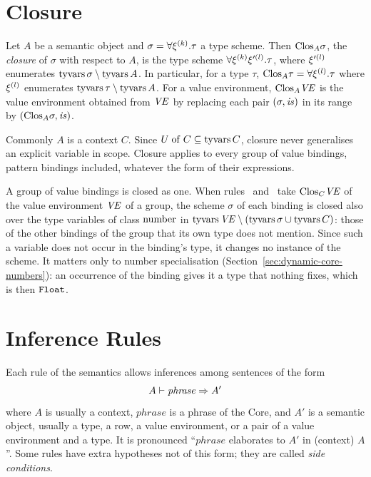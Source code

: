 \section{Closure}\label{sec:static-core-closure}

Let $A$ be a semantic object and $\sigma = \forall\xi^{(k)}.\tau$ a type
scheme. Then $\mathrm{Clos}_A \sigma$, the \emph{closure} of $\sigma$ with respect to
$A$, is the type scheme $\forall\xi^{(k)}\xi'^{(l)}.\tau$, where
$\xi'^{(l)}$ enumerates $\mathrm{tyvars}\,\sigma \setminus \mathrm{tyvars}\, A$. In
particular, for a type $\tau$, $\mathrm{Clos}_A \tau = \forall\xi^{(l)}.\tau$
where $\xi^{(l)}$ enumerates $\mathrm{tyvars}\,\tau \setminus \mathrm{tyvars}\, A$. For a
value environment, $\mathrm{Clos}_A \mathit{VE}$ is the value environment obtained from $\mathit{VE}$
by replacing each pair $(\sigma, \mathit{is})$ in its range by $(\mathrm{Clos}_A \sigma, \mathit{is})$.

Commonly $A$ is a context $C$. Since $U \mathrel{\mathrm{of}} C \subseteq \mathrm{tyvars}\, C$, closure
never generalises an explicit variable in scope. Closure applies to every group
of value bindings, pattern bindings included, whatever the form of their
expressions.

A group of value bindings is closed as one. When
rules~ and~ take
$\mathrm{Clos}_C \mathit{VE}$ of the value environment $\mathit{VE}$ of a group, the scheme $\sigma$ of
each binding is closed also over the type variables of class $\mathrm{number}$ in
$\mathrm{tyvars}\,\mathit{VE} \setminus (\mathrm{tyvars}\,\sigma \cup \mathrm{tyvars}\, C)$: those of the other
bindings of the group that its own type does not mention. Since such a variable
does not occur in the binding's type, it changes no instance of the scheme. It
matters only to number specialisation
(Section~\ref{sec:dynamic-core-numbers}): an occurrence of the binding gives it
a type that nothing fixes, which is then $\mathtt{Float}$. %

\section{Inference Rules}\label{sec:static-core-rules}

Each rule of the semantics allows inferences among sentences of the form
\[
  A \vdash \mathit{phrase} \Rightarrow A'
\]
where $A$ is usually a context, $\mathit{phrase}$ is a phrase of the Core, and
$A'$ is a semantic object, usually a type, a row, a value environment, or a pair
of a value environment and a type. It is pronounced ``$\mathit{phrase}$
elaborates to $A'$ in (context) $A$''. Some rules have extra hypotheses not of
this form; they are called \emph{side conditions}.

